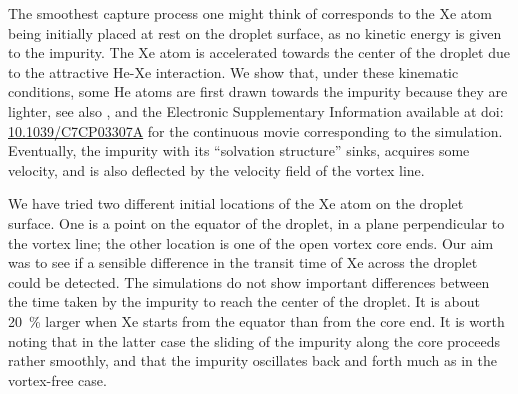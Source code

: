 

The smoothest capture process one might think of corresponds to  the Xe atom being initially placed at rest on the droplet surface, as no kinetic energy is 
given to the impurity. The Xe atom is accelerated  towards the center of the droplet due to the attractive He-Xe interaction. 
We show  that, under these kinematic conditions, some He atoms are first drawn towards the impurity because they are lighter, see also ,  and the Electronic Supplementary Information available at doi: \href{http://dx.doi.org/10.1039/C7CP03307A}{10.1039/C7CP03307A} for the continuous movie corresponding to the simulation. 
Eventually, the impurity with its ``solvation structure'' sinks, acquires some velocity, and is also deflected by the velocity field of the 
vortex line. 

 We have tried two different initial locations of the Xe atom on the droplet surface.  One is  a point on the equator of the droplet, in a plane perpendicular to the vortex line; 
 the other location is one of the open vortex core ends.  Our aim was to see if a sensible difference in the transit time of Xe across the droplet
could be detected.  The simulations do not show important differences between the time taken by the impurity to reach the center of the droplet. It is about 20~\% larger
when Xe starts from the equator than from the core end\citep{Coppens2017-2}. It is worth noting that  in the latter case the sliding of the impurity along the core proceeds rather smoothly, and that the impurity
oscillates back and forth much as in the vortex-free case. 


